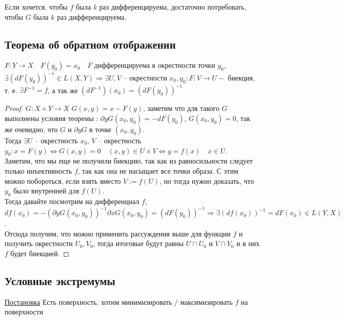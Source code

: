 \follow Если хочется, чтобы $f$ была $k$ раз дифференцируема, достаточно потребовать, чтобы $G$ была $k$ раз дифференцируема.

\subsection{Теорема об обратном отображении}
\begin{theorem}
    $F \colon Y \to X \quad F(y_0) = x_0 \quad F$ дифференцируема в окрестности точки $y_0$, $\exists (d F(y_0))^{-1} \in L(X, Y) \Rightarrow \exists U, V$ -- окрестности $x_0, y_0 \colon F \colon V \to U -$ биекция, т. е. $\exists F^{-1} = f$, а так же $(dF^{-1})(x_0) = (d F(y_0))^{-1}$
\end{theorem}
\begin{proof}
    $G \colon X \times Y \to X$ $G(x, y) = x - F(y)$, заметим что для такого $G$ выполнены условия теоремы : $\partial y G(x_0, y_0) = -d F(y_0)$, $G(x_0, y_0) = 0$, так же очевидно, что $G$ и $\partial y G$ в точке $(x_0, y_0)$.\\
    Тогда $\exists U$ -- окрестность $x_0$, $V$ -- окрестность $y_0 \colon x = F(y) \Leftrightarrow G(x, y) = 0 \quad (x, y) \in U \times V \Leftrightarrow y = f(x) \quad x \in U$.\\
    Заметим, что мы еще не получили биекцию, так как из равносильности следует только инъективность $f$, так как она не насыщает все точки образа. С этим можно побороться, если взять вместо $V := f(U)$, но тогда нужно доказать, что $y_0$ было внутренней для $f(U)$.\\
    Тогда давайте посмотрим на дифференциал $f$, $df(x_0) = -(\partial y G(x_0, y_0))^{-1} \partial x G(x_0, y_0) = (d F(y_0))^{-1} \Rightarrow \exists (d f(x_0))^{-1} = d F(x_0) \in L(Y, X)$.\\
    Отсюда получим, что можно применить рассуждения выше для функции $f$ и получить окрестности $U_0, V_0$, тогда итоговые будут равны $U \cap U_0$ и $V \cap V_0$ и в них $f$ будет биекцией.
\end{proof}

\subsection{Условные экстремумы}

\underline{Постановка} Есть поверхность, хотим минимизировать / максимизировать $f$ на поверхности


